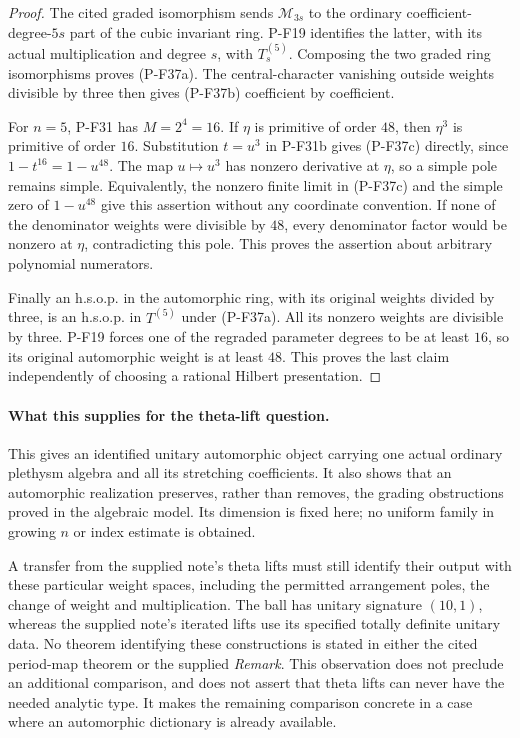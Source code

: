 \documentclass[11pt,a4paper]{article}
\begin{document}
\begin{proof}
The cited graded isomorphism sends $\mathcal M_{3s}$
to the ordinary coefficient-degree-$5s$ part of the cubic
invariant ring. P-F19 identifies the latter, with its actual
multiplication and degree $s$, with $T^{(5)}_s$.
Composing the two graded ring isomorphisms proves (P-F37a).
The central-character vanishing outside weights divisible
by three then gives (P-F37b) coefficient by coefficient.

For $n=5$, P-F31 has $M=2^4=16$. If $\eta$ is primitive
of order $48$, then $\eta^3$ is primitive of order $16$.
Substitution $t=u^3$ in P-F31b gives (P-F37c) directly,
since $1-t^{16}=1-u^{48}$. The map $u\mapsto u^3$
has nonzero derivative at $\eta$, so a simple pole
remains simple. Equivalently, the nonzero finite limit
in (P-F37c) and the simple zero of $1-u^{48}$ give
this assertion without any coordinate convention.
If none of the denominator weights were divisible by
$48$, every denominator factor would be nonzero at
$\eta$, contradicting this pole. This proves the
assertion about arbitrary polynomial numerators.

Finally an h.s.o.p. in the automorphic ring, with
its original weights divided by three, is an h.s.o.p.
in $T^{(5)}$ under (P-F37a). All its nonzero weights
are divisible by three. P-F19 forces one of the
regraded parameter degrees to be at least $16$,
so its original automorphic weight is at least $48$.
This proves the last claim independently of choosing
a rational Hilbert presentation.
\end{proof}

\paragraph{What this supplies for the theta-lift question.}
This gives an identified unitary automorphic object carrying
one actual ordinary plethysm algebra and all its stretching
coefficients. It also shows that an automorphic realization
preserves, rather than removes, the grading obstructions proved
in the algebraic model. Its dimension is fixed here; no
uniform family in growing $n$ or index estimate is obtained.

A transfer from the supplied note's theta lifts must still
identify their output with these particular weight spaces,
including the permitted arrangement poles, the change of
weight and multiplication. The ball has unitary signature
$(10,1)$, whereas the supplied note's iterated lifts use
its specified totally definite unitary data. No theorem
identifying these constructions is stated in either the
cited period-map theorem or the supplied \emph{Remark}.
This observation does not preclude an additional comparison,
and does not assert that theta lifts can never have the
needed analytic type. It makes the remaining comparison
concrete in a case where an automorphic dictionary is
already available.
\end{document}
